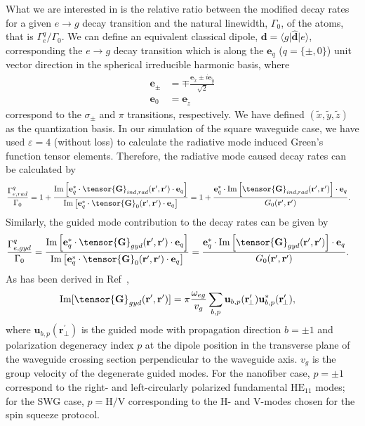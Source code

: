 \documentclass[pra,twocolumn,floatfix,superscriptaddress]{revtex4-1} %
\def\br{\mathbf{r}}
\def\bra#1{\langle{#1}\rvert}%
\def\ket#1{\lvert{#1}\rangle}%
\begin{document}
\begin{appendix}
    
What we are interested in is the relative ratio between the modified decay rates for a given $e\rightarrow g$ decay transition and the natural linewidth, $ \Gamma_0 $, of the atoms, that is $ \Gamma_e^q/\Gamma_0 $. 
We can define an equivalent classical dipole, $ \mathbf{d}=\bra{g}\hat{\mathbf{d}}\ket{e} $, corresponding the $ e\rightarrow g $ decay transition which is along the $ \mathbf{e}_q $ ($q=\{\pm,0\}$) unit vector direction in the spherical irreducible harmonic basis, where
\begin{align}
    \mathbf{e}_\pm &=\mp \frac{\mathbf{e}_{\tilde{x}}\pm i\mathbf{e}_{\tilde{y}}}{\sqrt{2}}\\
    \mathbf{e}_0 &=\mathbf{e}_{\tilde{z}}
\end{align}
correspond to the $\sigma_\pm$ and $\pi$ transitions, respectively.
We have defined $ (\tilde{x},\tilde{y},\tilde{z}) $ as the quantization basis.
In our simulation of the square waveguide case, we have used $\varepsilon=4$ (without loss) to calculate the radiative mode induced Green's function tensor elements.
Therefore, the radiative mode caused decay rates can be calculated by
\begin{align}
\frac{\Gamma_{e,rad}^{q}}{\Gamma_0} &= 1+ \frac{\mathrm{Im}\left[\mathbf{e}_q^*\cdot \tensor{\mathbf{G}}_{ind,rad}(\mathbf{r}',\mathbf{r}')\cdot \mathbf{e}_q\right]}{ \mathrm{Im}\left[\mathbf{e}_q^*\cdot \tensor{\mathbf{G}}_0(\mathbf{r}',\mathbf{r}')\cdot \mathbf{e}_q\right]}
=1+ \frac{\mathbf{e}_q^*\cdot \mathrm{Im}\left[\tensor{\mathbf{G}}_{ind,rad}(\mathbf{r}',\mathbf{r}')\right]\cdot \mathbf{e}_q}{G_0(\mathbf{r}',\mathbf{r}')}.
\end{align}
Similarly, the guided mode contribution to the decay rates can be given by
\begin{align}
\frac{\Gamma_{e,gyd}^{q}}{\Gamma_0} &= \frac{\mathrm{Im}\left[\mathbf{e}_q^*\cdot \tensor{\mathbf{G}}_{gyd}(\mathbf{r}',\mathbf{r}')\cdot \mathbf{e}_q\right]}{ \mathrm{Im}\left[\mathbf{e}_q^*\cdot \tensor{\mathbf{G}}_0(\mathbf{r}',\mathbf{r}')\cdot \mathbf{e}_q\right]}
= \frac{\mathbf{e}_q^*\cdot \mathrm{Im}\left[ \tensor{\mathbf{G}}_{gyd}(\mathbf{r}',\mathbf{r}')\right]\cdot \mathbf{e}_q}{ G_0(\mathbf{r}',\mathbf{r}')}.
\end{align}
As has been derived in Ref~\cite{Qi2016},
\begin{align}
\mathrm{Im}[\tensor{\mathbf{G}}_{gyd}(\br',\br')] &= \pi \frac{\omega_{eg}}{v_g } \sum_{b, p} 
		\mathbf{u}_{b, p} (\br_{\!\perp}^\prime)\mathbf{u}^*_{b , p} (\br_{\!\perp}^\prime),
\end{align}
where $\mathbf{u}_{b, p} (\br_{\!\perp}^\prime)$ is the guided mode with propagation direction $ b=\pm 1 $ and polarization degeneracy index $ p $ at the dipole position in the transverse plane of the waveguide crossing section perpendicular to the waveguide axis.
$v_g$ is the group velocity of the degenerate guided modes.
For the nanofiber case, $ p=\pm 1 $ correspond to the right- and left-circularly polarized fundamental $\mathrm{HE}_{11}$ modes; 
for the SWG case, $ p=\mathrm{H}/\mathrm{V} $ corresponding to the H- and V-modes chosen for the spin squeeze protocol.


\end{appendix}
\end{document}
